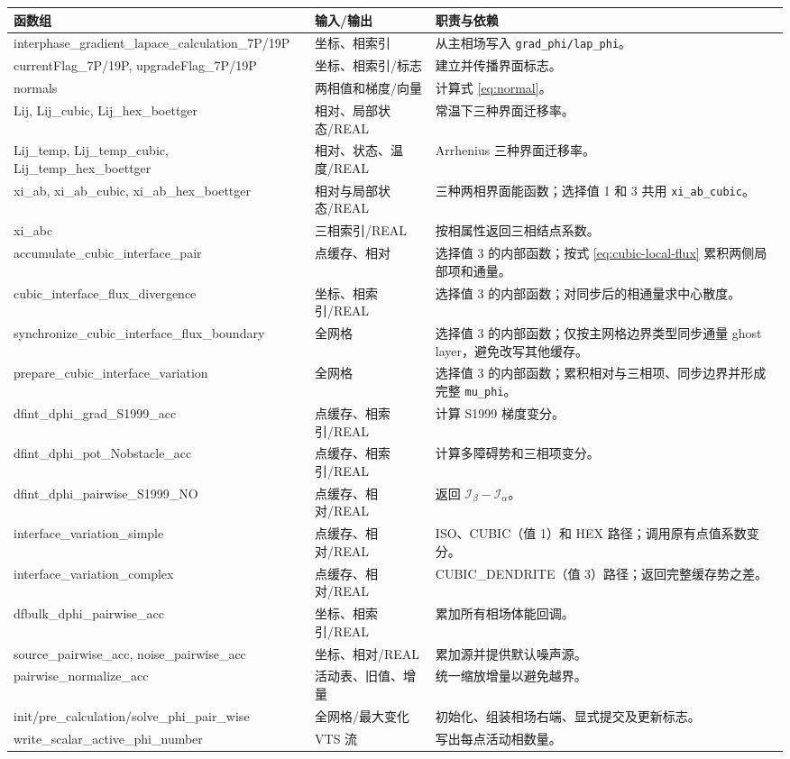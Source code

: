 \documentclass[UTF8,a4paper,11pt]{ctexart}
\newcommand{\code}[1]{\texttt{#1}}
\begin{document}
\begin{longtable}{>{\ttfamily}p{}p{}p{}}
\toprule
\normalfont 函数组 & 输入/输出 & 职责与依赖\\
\midrule
\endhead
interphase\_gradient\_lapace\_calculation\_7P/19P & 坐标、相索引 & 从主相场写入 \code{grad\_phi/lap\_phi}。\\
currentFlag\_7P/19P, upgradeFlag\_7P/19P & 坐标、相索引/标志 & 建立并传播界面标志。\\
normals & 两相值和梯度/向量 & 计算式 \eqref{eq:normal}。\\
Lij, Lij\_cubic, Lij\_hex\_boettger & 相对、局部状态/REAL & 常温下三种界面迁移率。\\
Lij\_temp, Lij\_temp\_cubic, Lij\_temp\_hex\_boettger & 相对、状态、温度/REAL & Arrhenius 三种界面迁移率。\\
xi\_ab, xi\_ab\_cubic, xi\_ab\_hex\_boettger & 相对与局部状态/REAL & 三种两相界面能函数；选择值 1 和 3 共用 \code{xi\_ab\_cubic}。\\
xi\_abc & 三相索引/REAL & 按相属性返回三相结点系数。\\
accumulate\_cubic\_interface\_pair & 点缓存、相对 & 选择值 3 的内部函数；按式 \eqref{eq:cubic-local-flux} 累积两侧局部项和通量。\\
cubic\_interface\_flux\_divergence & 坐标、相索引/REAL & 选择值 3 的内部函数；对同步后的相通量求中心散度。\\
synchronize\_cubic\_interface\_flux\_boundary & 全网格 & 选择值 3 的内部函数；仅按主网格边界类型同步通量 ghost layer，避免改写其他缓存。\\
prepare\_cubic\_interface\_variation & 全网格 & 选择值 3 的内部函数；累积相对与三相项、同步边界并形成完整 \code{mu\_phi}。\\
dfint\_dphi\_grad\_S1999\_acc & 点缓存、相索引/REAL & 计算 S1999 梯度变分。\\
dfint\_dphi\_pot\_Nobstacle\_acc & 点缓存、相索引/REAL & 计算多障碍势和三相项变分。\\
dfint\_dphi\_pairwise\_S1999\_NO & 点缓存、相对/REAL & 返回 $\mathcal I_\beta-\mathcal I_\alpha$。\\
interface\_variation\_simple & 点缓存、相对/REAL & ISO、CUBIC（值 1）和 HEX 路径；调用原有点值系数变分。\\
interface\_variation\_complex & 点缓存、相对/REAL & CUBIC\_DENDRITE（值 3）路径；返回完整缓存势之差。\\
dfbulk\_dphi\_pairwise\_acc & 坐标、相索引/REAL & 累加所有相场体能回调。\\
source\_pairwise\_acc, noise\_pairwise\_acc & 坐标、相对/REAL & 累加源并提供默认噪声源。\\
pairwise\_normalize\_acc & 活动表、旧值、增量 & 统一缩放增量以避免越界。\\
init/pre\_calculation/solve\_phi\_pair\_wise & 全网格/最大变化 & 初始化、组装相场右端、显式提交及更新标志。\\
write\_scalar\_active\_phi\_number & VTS 流 & 写出每点活动相数量。\\
\bottomrule
\end{longtable}
\end{document}
